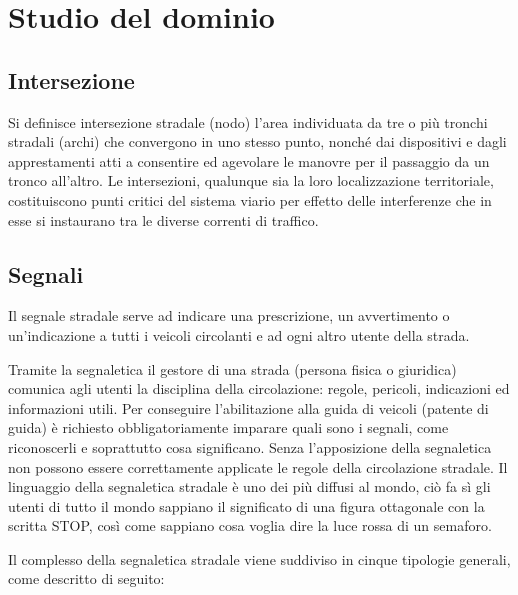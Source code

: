 \chapter{Studio del dominio}

\section{Intersezione}
Si definisce intersezione stradale (nodo) l'area individuata da tre o più tronchi stradali (archi) che convergono in uno stesso punto, nonché dai dispositivi e dagli apprestamenti atti a consentire ed agevolare le manovre per il passaggio da un tronco all'altro.
Le intersezioni, qualunque sia la loro localizzazione territoriale, costituiscono punti critici del sistema viario per effetto delle interferenze che in esse si instaurano tra le diverse correnti di traffico.

\section{Segnali}
Il segnale stradale serve ad indicare una prescrizione, un avvertimento o un'indicazione a tutti i veicoli circolanti e ad ogni altro utente della strada.

Tramite la segnaletica il gestore di una strada (persona fisica o giuridica) comunica agli utenti la disciplina della circolazione: regole, pericoli, indicazioni ed informazioni utili. Per conseguire l'abilitazione alla guida di veicoli (patente di guida) è richiesto obbligatoriamente imparare quali sono i segnali, come riconoscerli e soprattutto cosa significano. Senza l'apposizione della segnaletica non possono essere correttamente applicate le regole della circolazione stradale. Il linguaggio della segnaletica stradale è uno dei più diffusi al mondo, ciò fa sì gli utenti di tutto il mondo sappiano il significato di una figura ottagonale con la scritta STOP, così come sappiano cosa voglia dire la luce rossa di un semaforo.

Il complesso della segnaletica stradale viene suddiviso in cinque tipologie generali\cite{CdsTitIICapoII}, come descritto di seguito:

